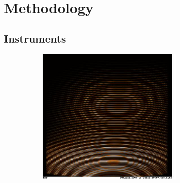 \chapter{Methodology}
\label{methods}
    \section{Instruments}
        \begin{figure}[H]
        \centering
        \begin{subfigure}{.45\textwidth}
            \centering
            \includegraphics[width=0.8\textwidth]{report/images/chap3_methods/coralie_grating.jpg}
            \vspace{2em}
        \end{subfigure}%
        \hspace{1em}
        \begin{subfigure}{.45\textwidth}
            \centering

\end{subfigure}
\end{figure}
